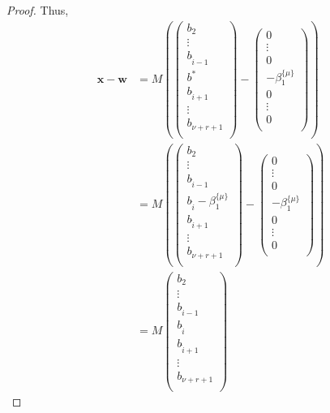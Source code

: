 \documentclass[11pt]{report}
\theoremstyle{definition}
\begin{document}
\begin{proof}
Thus,
  \begin{align*}
    \mathbf{x} - \mathbf{w}
    & = M\left(
      \begin{pmatrix}
        b_2 \\ \vdots \\ b_{\hat{i} -1} \\ b^* \\ b_{\hat{i} +1} \\ \vdots \\ b_{\nu+r+1} \\
      \end{pmatrix}
    -
    \begin{pmatrix}
      0 \\ \vdots \\ 0 \\ -\beta_1^{\{\mu\}} \\ 0 \\ \vdots \\ 0 \\
    \end{pmatrix}
    \right)\\
    & = M\left(
      \begin{pmatrix}
        b_2 \\ \vdots \\ b_{\hat{i} -1} \\ b_{\hat{i}} -\beta_1^{\{\mu\}} \\ b_{\hat{i} +1} \\ \vdots
        \\ b_{\nu+r+1} \\
      \end{pmatrix}
    -
    \begin{pmatrix}
      0 \\ \vdots \\ 0 \\ -\beta_1^{\{\mu\}} \\ 0 \\ \vdots \\ 0 \\
    \end{pmatrix}
    \right)\\
    & = M \begin{pmatrix}
      b_2 \\ \vdots \\ b_{\hat{i} -1} \\ b_{\hat{i}}  \\ b_{\hat{i} +1} \\ \vdots  \\ b_{\nu+r+1} \\

\end{pmatrix}
\end{align*}
\end{proof}
\end{document}
